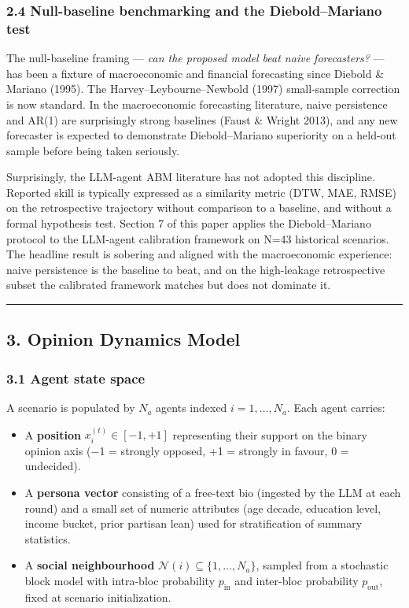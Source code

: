 \documentclass[
]{article}
\providecommand{\tightlist}{%
  \setlength{\itemsep}{0pt}\setlength{\parskip}{0pt}}
\begin{document}
\subsubsection{2.4 Null-baseline benchmarking and the Diebold--Mariano
test}\label{null-baseline-benchmarking-and-the-dieboldmariano-test}

The null-baseline framing --- \emph{can the proposed model beat naive
forecasters?} --- has been a fixture of macroeconomic and financial
forecasting since Diebold \& Mariano (1995). The
Harvey--Leybourne--Newbold (1997) small-sample correction is now
standard. In the macroeconomic forecasting literature, naive persistence
and AR(1) are surprisingly strong baselines (Faust \& Wright 2013), and
any new forecaster is expected to demonstrate Diebold--Mariano
superiority on a held-out sample before being taken seriously.

Surprisingly, the LLM-agent ABM literature has not adopted this
discipline. Reported skill is typically expressed as a similarity metric
(DTW, MAE, RMSE) on the retrospective trajectory without comparison to a
baseline, and without a formal hypothesis test. Section 7 of this paper
applies the Diebold--Mariano protocol to the LLM-agent calibration
framework on N=43 historical scenarios. The headline result is sobering
and aligned with the macroeconomic experience: naive persistence is the
baseline to beat, and on the high-leakage retrospective subset the
calibrated framework matches but does not dominate it.

\begin{center}\rule{0.5\linewidth}{0.5pt}\end{center}

\subsection{3. Opinion Dynamics Model}\label{opinion-dynamics-model}

\subsubsection{3.1 Agent state space}\label{agent-state-space}

A scenario is populated by \(N_a\) agents indexed
\(i = 1, \ldots, N_a\). Each agent carries:

\begin{itemize}
\tightlist
\item
  A \textbf{position} \(x_i^{(t)} \in [-1, +1]\) representing their
  support on the binary opinion axis (−1 = strongly opposed, +1 =
  strongly in favour, 0 = undecided).
\item
  A \textbf{persona vector} consisting of a free-text bio (ingested by
  the LLM at each round) and a small set of numeric attributes (age
  decade, education level, income bucket, prior partisan lean) used for
  stratification of summary statistics.
\item
  A \textbf{social neighbourhood}
  \(\mathcal{N}(i) \subseteq \{1, \ldots, N_a\}\), sampled from a
  stochastic block model with intra-bloc probability \(p_{\text{in}}\)
  and inter-bloc probability \(p_{\text{out}}\), fixed at scenario
  initialization.
\end{itemize}
\end{document}
